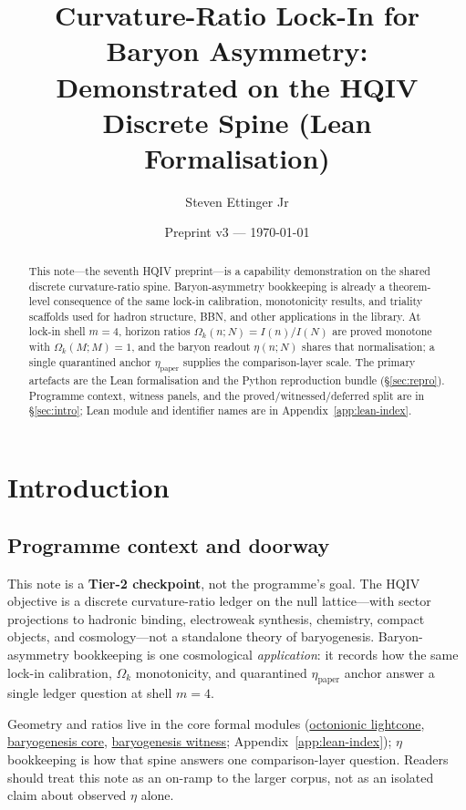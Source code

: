 \documentclass[11pt]{amsart}
\title[Curvature-ratio lock-in on the HQIV spine]{Curvature-Ratio Lock-In for Baryon Asymmetry:\\
Demonstrated on the HQIV Discrete Spine (Lean Formalisation)}
\author{Steven Ettinger Jr}
\date{Preprint v3 --- \today}
\newcommand{\LeanEng}[2]{\hyperref[#1]{#2}}
\begin{document}
\begin{abstract}
This note---the seventh HQIV preprint---is a capability demonstration on
the shared discrete curvature-ratio spine. Baryon-asymmetry bookkeeping is
already a theorem-level consequence of the same lock-in calibration,
monotonicity results, and triality scaffolds used for hadron structure,
BBN, and other applications in the library. At lock-in shell $m=4$,
horizon ratios $\Omega_k(n;N)=I(n)/I(N)$ are proved monotone with
$\Omega_k(M;M)=1$, and the baryon readout $\eta(n;N)$ shares that
normalisation; a single quarantined anchor $\eta_{\mathrm{paper}}$
supplies the comparison-layer scale. The primary artefacts are the Lean
formalisation and the Python reproduction bundle
(\S\ref{sec:repro}). Programme context, witness panels, and the
proved/witnessed/deferred split are in \S\ref{sec:intro}; Lean module
and identifier names are in Appendix~\ref{app:lean-index}.
\end{abstract}
\maketitle



\section{Introduction}
\label{sec:intro}

\subsection{Programme context and doorway}
This note is a \textbf{Tier-2 checkpoint}, not the programme's goal.
The HQIV objective is a discrete curvature-ratio ledger on the null
lattice---with sector projections to hadronic binding, electroweak
synthesis, chemistry, compact objects, and cosmology---not a standalone
theory of baryogenesis. Baryon-asymmetry bookkeeping is one cosmological
\emph{application}: it records how the same lock-in calibration,
$\Omega_k$ monotonicity, and quarantined $\eta_{\mathrm{paper}}$ anchor
answer a single ledger question at shell $m=4$.

Geometry and ratios live in the core formal modules
(\LeanEng{lean:lightcone}{octonionic lightcone},
\LeanEng{lean:baryogenesis-core}{baryogenesis core},
\LeanEng{lean:baryogenesis-witness}{baryogenesis witness};
Appendix~\ref{app:lean-index}); $\eta$ bookkeeping is how that spine
answers one comparison-layer question. Readers should treat this note as
an on-ramp to the larger corpus, not as an isolated claim about observed
$\eta$ alone.
\end{document}
